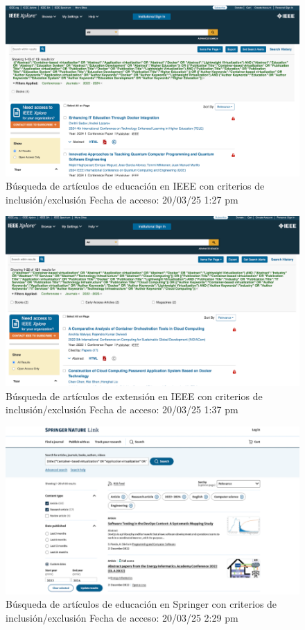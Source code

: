 \FloatBarrier\begin{figure}[htbp]
    \centering
    \includegraphics[width=\textwidth,keepaspectratio]{apendices/BD/criterios/IEEE-ed.png}
    \caption{Búsqueda de artículos de educación en IEEE con criterios de inclusión/exclusión
    Fecha de acceso: 20/03/25 1:27 pm
    }\label{fig:busqueda19}
\end{figure}
\FloatBarrier\begin{figure}[htbp]
    \centering
    \includegraphics[width=\textwidth,keepaspectratio]{apendices/BD/criterios/IEEE-ind.png}
    \caption{Búsqueda de artículos de extensión en IEEE con criterios de inclusión/exclusión
    Fecha de acceso: 20/03/25 1:37 pm
    }\label{fig:busqueda21}
\end{figure}
\FloatBarrier\begin{figure}[htbp]
    \centering
    \includegraphics[width=\textwidth,keepaspectratio]{apendices/BD/criterios/Springer-ed.png}
    \caption{Búsqueda de artículos de educación en Springer con criterios de inclusión/exclusión
    Fecha de acceso: 20/03/25 2:29 pm
    }\label{fig:busqueda22}
\end{figure}
